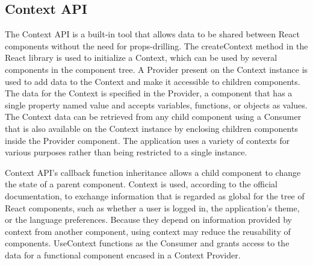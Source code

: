 \subsection{Context API}

The Context API is a built-in tool that allows data to be shared between React components without the need for props-drilling. The createContext method in the React library is used to initialize a Context, which can be used by several components in the component tree. A Provider present on the Context instance is used to add data to the Context and make it accessible to children components. The data for the Context is specified in the Provider, a component that has a single property named value and accepts variables, functions, or objects as values. The Context data can be retrieved from any child component using a Consumer that is also available on the Context instance by enclosing children components inside the Provider component. The application uses a variety of contexts for various purposes rather than being restricted to a single instance.

Context API's callback function inheritance allows a child component to change the state of a parent component. Context is used, according to the official documentation, to exchange information that is regarded as global for the tree of React components, such as whether a user is logged in, the application's theme, or the language preferences. Because they depend on information provided by context from another component, using context may reduce the reusability of components. UseContext functions as the Consumer and grants access to the data for a functional component encased in a Context Provider.

